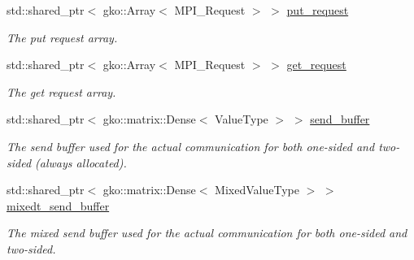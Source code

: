 \begin{DoxyCompactItemize}
std\+::shared\+\_\+ptr$<$ gko\+::\+Array$<$ M\+P\+I\+\_\+\+Request $>$ $>$ \hyperlink{structschwz_1_1Communicate_1_1comm__struct_a9f135d4c33838027f8ed64a3ee18d42f}{put\+\_\+request}
\begin{DoxyCompactList}\small\item\em The put request array. \end{DoxyCompactList}\item 
\mbox{\label{structschwz_1_1Communicate_1_1comm__struct_a91cc6e7d906fbb693e4dff2dee609c94}} 
std\+::shared\+\_\+ptr$<$ gko\+::\+Array$<$ M\+P\+I\+\_\+\+Request $>$ $>$ \hyperlink{structschwz_1_1Communicate_1_1comm__struct_a91cc6e7d906fbb693e4dff2dee609c94}{get\+\_\+request}
\begin{DoxyCompactList}\small\item\em The get request array. \end{DoxyCompactList}\item 
\mbox{\label{structschwz_1_1Communicate_1_1comm__struct_afc441e718856c45bd3cc462780886ca8}} 
std\+::shared\+\_\+ptr$<$ gko\+::matrix\+::\+Dense$<$ Value\+Type $>$ $>$ \hyperlink{structschwz_1_1Communicate_1_1comm__struct_afc441e718856c45bd3cc462780886ca8}{send\+\_\+buffer}
\begin{DoxyCompactList}\small\item\em The send buffer used for the actual communication for both one-\/sided and two-\/sided (always allocated). \end{DoxyCompactList}\item 
\mbox{\label{structschwz_1_1Communicate_1_1comm__struct_a357d96eeeb734a275f78782e7e6542a8}} 
std\+::shared\+\_\+ptr$<$ gko\+::matrix\+::\+Dense$<$ Mixed\+Value\+Type $>$ $>$ \hyperlink{structschwz_1_1Communicate_1_1comm__struct_a357d96eeeb734a275f78782e7e6542a8}{mixedt\+\_\+send\+\_\+buffer}
\begin{DoxyCompactList}\small\item\em The mixed send buffer used for the actual communication for both one-\/sided and two-\/sided. \end{DoxyCompactList}\item 
\mbox{\label{structschwz_1_1Communicate_1_1comm__struct_a7b02126d598b9054b9adf0ebc9b3138c}} 

\end{DoxyCompactItemize}
